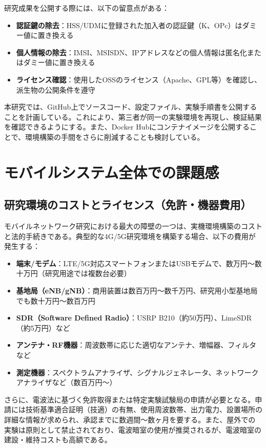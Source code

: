 研究成果を公開する際には、以下の留意点がある：

\begin{itemize}
\item \textbf{認証鍵の除去}：HSS/UDMに登録された加入者の認証鍵（K、OPc）はダミー値に置き換える
\item \textbf{個人情報の除去}：IMSI、MSISDN、IPアドレスなどの個人情報は匿名化またはダミー値に置き換える
\item \textbf{ライセンス確認}：使用したOSSのライセンス（Apache、GPL等）を確認し、派生物の公開条件を遵守
\end{itemize}

本研究では、GitHub上でソースコード、設定ファイル、実験手順書を公開することを計画している。これにより、第三者が同一の実験環境を再現し、検証結果を確認できるようにする。また、Docker Hubにコンテナイメージを公開することで、環境構築の手間をさらに削減することも検討している。

\section{モバイルシステム全体での課題感}

\subsection{研究環境のコストとライセンス（免許・機器費用）}

モバイルネットワーク研究における最大の障壁の一つは、実機環境構築のコストと法的手続きである。典型的な4G/5G研究環境を構築する場合、以下の費用が発生する：

\begin{itemize}
\item \textbf{端末/モデム}：LTE/5G対応スマートフォンまたはUSBモデムで、数万円〜数十万円（研究用途では複数台必要）
\item \textbf{基地局（eNB/gNB）}：商用装置は数百万円〜数千万円、研究用小型基地局でも数十万円〜数百万円
\item \textbf{SDR（Software Defined Radio）}：USRP B210（約50万円）、LimeSDR（約5万円）など
\item \textbf{アンテナ・RF機器}：周波数帯に応じた適切なアンテナ、増幅器、フィルタなど
\item \textbf{測定機器}：スペクトラムアナライザ、シグナルジェネレータ、ネットワークアナライザなど（数百万円〜）
\end{itemize}

さらに、電波法に基づく免許取得または特定実験試験局の申請が必要となる。申請には技術基準適合証明（技適）の有無、使用周波数帯、出力電力、設置場所の詳細な情報が求められ、承認までに数週間〜数ヶ月を要する。また、屋外での実験は原則として禁止されており、電波暗室の使用が推奨されるが、電波暗室の建設・維持コストも高額である。

